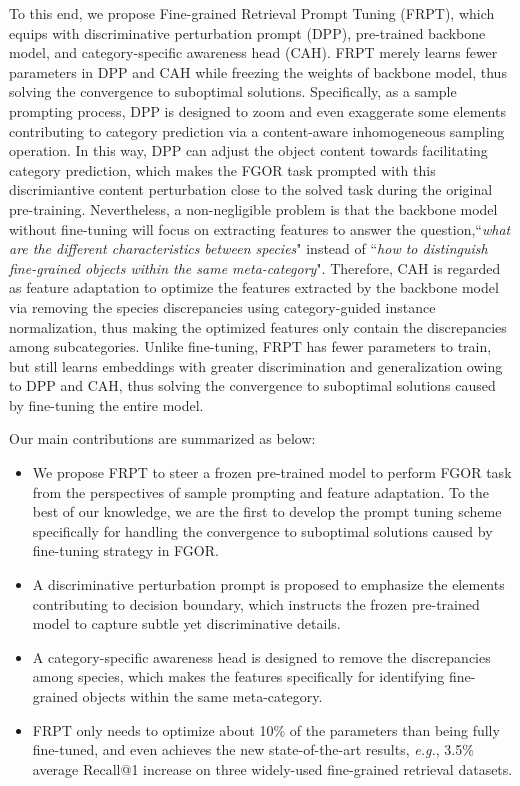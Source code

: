 \documentclass[letterpaper]{article} %
\begin{document}
To this end, we propose Fine-grained Retrieval Prompt Tuning (FRPT), which equips with  discriminative perturbation prompt (DPP), pre-trained backbone model, and category-specific awareness head (CAH).
FRPT merely learns fewer parameters in DPP and CAH while freezing the weights of backbone model, thus solving the convergence to suboptimal solutions.
Specifically, as a sample prompting process, DPP is designed to zoom and even exaggerate some elements contributing to category prediction via a content-aware inhomogeneous sampling operation.
In this way, DPP can adjust the object content towards facilitating category prediction, which makes the FGOR task prompted with this discrimiantive content perturbation close to the solved task during the original pre-training.
Nevertheless, a non-negligible problem is that the backbone model without fine-tuning will focus on extracting features to answer the question,``{\it what are the different characteristics between species}" instead of ``{\it how to distinguish fine-grained objects within the same meta-category}".
Therefore, CAH is regarded as feature adaptation to optimize the features extracted by the backbone model via removing the species discrepancies using category-guided instance normalization, thus making the optimized features only contain the discrepancies among subcategories.
Unlike fine-tuning, FRPT has fewer parameters to train, but still learns embeddings with greater discrimination and generalization owing to DPP and CAH, thus solving the convergence to suboptimal solutions caused by fine-tuning the entire model.









Our main contributions are summarized as below:
\begin{itemize}
\item  We propose FRPT to steer a frozen pre-trained model to perform FGOR task from the perspectives of sample prompting and feature adaptation. To the best of our knowledge, we are the first to develop the prompt tuning scheme specifically for handling the convergence to suboptimal solutions caused by fine-tuning strategy in FGOR.

\item A discriminative perturbation prompt is proposed to emphasize the elements contributing to decision boundary, which instructs the frozen pre-trained model to capture subtle yet discriminative details.

\item A category-specific awareness head is designed to remove the discrepancies among species, which makes the features specifically for identifying fine-grained objects within the same meta-category.


\item FRPT only needs to optimize about 10\% of the parameters than being fully fine-tuned, and even achieves the new state-of-the-art results, {\it e.g.}, 3.5\% average Recall@1 increase on three widely-used fine-grained retrieval datasets.
\end{itemize}
\end{document}
